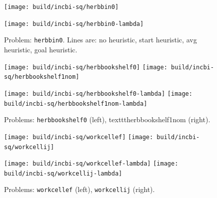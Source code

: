 \begin{figure}
   \centering
   \texttt{[image: build/incbi-sq/herbbin0]}
   
   \texttt{[image: build/incbi-sq/herbbin0-lambda]}
   \caption{Problem: \texttt{herbbin0}.
      Lines are:
      \protect{} no heuristic,
      \protect{} start heuristic,
      \protect{} avg heuristic,
      \protect{} goal heuristic.
      }
\end{figure}

\begin{figure}
   \centering
   \texttt{[image: build/incbi-sq/herbbookshelf0]}
   \texttt{[image: build/incbi-sq/herbbookshelf1nom]}
   
   \texttt{[image: build/incbi-sq/herbbookshelf0-lambda]}
   \texttt{[image: build/incbi-sq/herbbookshelf1nom-lambda]}
   \caption{Problems: \texttt{herbbookshelf0} (left), texttt{herbbookshelf1nom} (right).}
\end{figure}

\begin{figure}
   \centering
   \texttt{[image: build/incbi-sq/workcellef]}
   \texttt{[image: build/incbi-sq/workcellij]}
   
   \texttt{[image: build/incbi-sq/workcellef-lambda]}
   \texttt{[image: build/incbi-sq/workcellij-lambda]}
   \caption{Problems: \texttt{workcellef} (left), \texttt{workcellij} (right).}
\end{figure}
